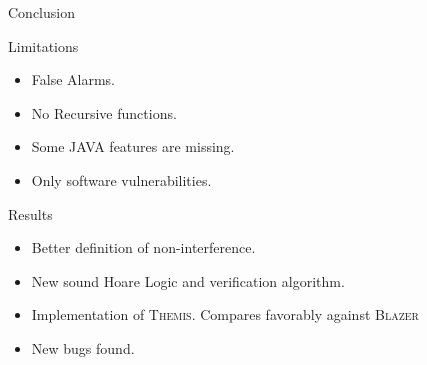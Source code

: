 \documentclass[page number]{beamer}
\begin{document}
\begin{frame}{Conclusion}
  \begin{alertblock}{Limitations}
  \begin{itemize}
  \item False Alarms.
  \item No Recursive functions.
  \item Some JAVA features are missing.
  \item Only software vulnerabilities.
  \end{itemize}
  \end{alertblock}
  \vfill
  \begin{exampleblock}{Results}
    \begin{itemize}
    \item Better definition of non-interference.
    \item New sound Hoare Logic and verification algorithm.
    \item Implementation of \textsc{Themis}. Compares favorably against \textsc{Blazer}
    \item New bugs found.
    \end{itemize}
  \end{exampleblock}
\end{frame}
\end{document}
